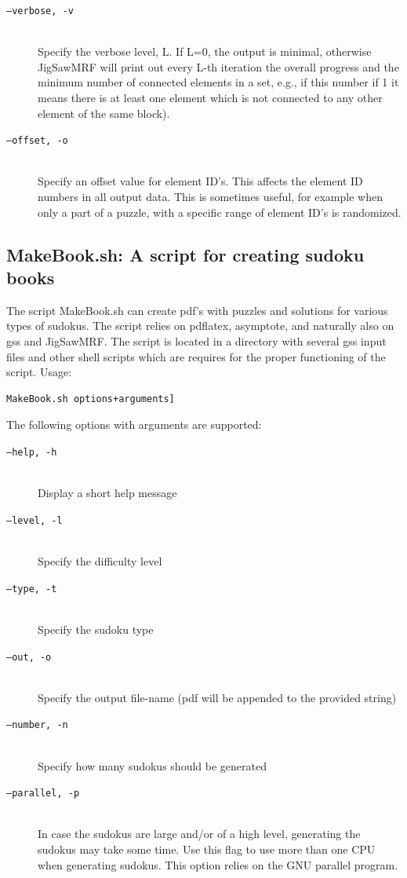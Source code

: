 \documentclass[12pt]{article}
\begin{document}
\begin{description}
\item [\texttt{--verbose, -v}] \hfill \\ Specify the verbose level, L. If  L=0, the output is minimal, otherwise  JigSawMRF will print out every L-th iteration the 
overall progress and the minimum number of connected elements in a set, e.g., if this number if 1 it means there is at least one element which is not connected to any other element of the same block).
\item [\texttt{--offset, -o}] \hfill \\ Specify an offset value for element ID's. This affects the element ID numbers in all output data. This is sometimes useful, for example when only a part of a puzzle, with a specific range of element ID's is randomized.
\end{description}

\subsection{\label{book}MakeBook.sh: A script for creating sudoku books}
The script MakeBook.sh can create pdf's with puzzles and solutions for various types of sudokus. The script relies on pdflatex, asymptote, and naturally also on gss and JigSawMRF. The script is located in a directory with several gss input files and other shell scripts which are requires for the proper functioning of the script. Usage:
\begin{verbatim}
MakeBook.sh options+arguments]
\end{verbatim}
The following options with arguments are supported:
\begin{description}
\item [\texttt{--help, -h}] \hfill \\ Display a short help message
\item [\texttt{--level, -l}] \hfill \\ Specify the difficulty level
\item [\texttt{--type, -t}] \hfill \\ Specify the sudoku type
\item [\texttt{--out, -o}] \hfill \\ Specify the output file-name (pdf will be appended to the provided string)
\item [\texttt{--number, -n}] \hfill \\ Specify how many sudokus should be generated
\item [\texttt{--parallel, -p}] \hfill \\ In case the sudokus are large and/or of a high level, generating the sudokus may take some time. Use this flag to use more than one CPU when generating sudokus. This option relies on the GNU parallel program. 
\end{description}
\end{document}

